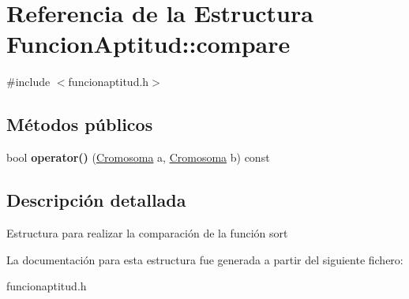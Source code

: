 \hypertarget{structFuncionAptitud_1_1compare}{\section{Referencia de la Estructura Funcion\-Aptitud\-:\-:compare}
\label{structFuncionAptitud_1_1compare}
}


{\ttfamily \#include $<$funcionaptitud.\-h$>$}

\subsection*{Métodos públicos}
\begin{DoxyCompactItemize}
\item 
\hypertarget{structFuncionAptitud_1_1compare_ac7400ce0c2f1c80b038e35282ec2e379}{bool {\bfseries operator()} (\hyperlink{classCromosoma}{Cromosoma} a, \hyperlink{classCromosoma}{Cromosoma} b) const }\label{structFuncionAptitud_1_1compare_ac7400ce0c2f1c80b038e35282ec2e379}

\end{DoxyCompactItemize}


\subsection{Descripción detallada}
Estructura para realizar la comparación de la función sort 

La documentación para esta estructura fue generada a partir del siguiente fichero\-:\begin{DoxyCompactItemize}
\item 
funcionaptitud.\-h\end{DoxyCompactItemize}
